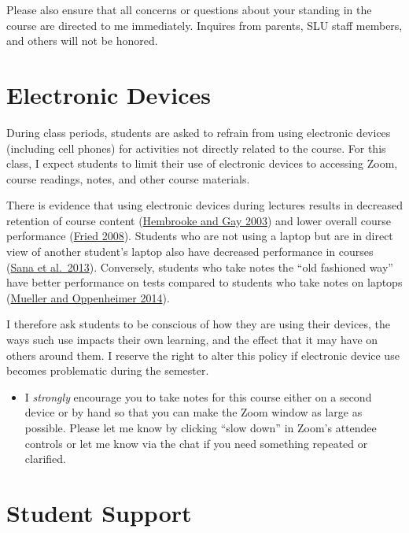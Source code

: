 \documentclass[
]{book}
\newenvironment{rmdblock}[1]
  {\begin{shaded*}
  \begin{itemize}
  \renewcommand{\labelitemi}{
    \raisebox{-.7\height}[0pt][0pt]{
      {\setkeys{Gin}{width=3em,keepaspectratio}\texttt{[image: images/\#1]}}
    }
  }
  \item
  }
  {
  \end{itemize}
  \end{shaded*}
  }
\newenvironment{rmdnote}
  {\begin{rmdblock}{note}}
  {\end{rmdblock}}
\begin{document}
Please also ensure that all concerns or questions about your standing in the course are directed to me immediately. Inquires from parents, SLU staff members, and others will not be honored.

\hypertarget{electronic-devices}{%
\section{Electronic Devices}\label{electronic-devices}}

During class periods, students are asked to refrain from using electronic devices (including cell phones) for activities not directly related to the course. For this class, I expect students to limit their use of electronic devices to accessing Zoom, course readings, notes, and other course materials.

There is evidence that using electronic devices during lectures results in decreased retention of course content (\href{https://link.springer.com/article/10.1007/BF02940852}{Hembrooke and Gay 2003}) and lower overall course performance (\href{https://www.sciencedirect.com/science/article/pii/S0360131506001436}{Fried 2008}). Students who are not using a laptop but are in direct view of another student's laptop also have decreased performance in courses (\href{https://www.sciencedirect.com/science/article/pii/S0360131512002254}{Sana et al.~2013}). Conversely, students who take notes the ``old fashioned way'' have better performance on tests compared to students who take notes on laptops (\href{http://journals.sagepub.com/doi/abs/10.1177/0956797614524581}{Mueller and Oppenheimer 2014}).

I therefore ask students to be conscious of how they are using their devices, the ways such use impacts their own learning, and the effect that it may have on others around them. I reserve the right to alter this policy if electronic device use becomes problematic during the semester.

\begin{rmdnote}
I \emph{strongly} encourage you to take notes for this course either on
a second device or by hand so that you can make the Zoom window as large
as possible. Please let me know by clicking ``slow down'' in Zoom's
attendee controls or let me know via the chat if you need something
repeated or clarified.
\end{rmdnote}

\hypertarget{student-support}{%
\section{Student Support}\label{student-support}}
\end{document}
